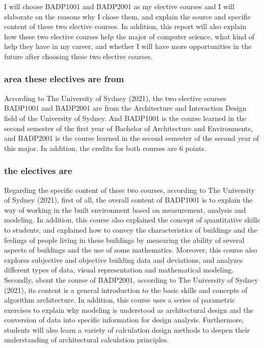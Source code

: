 \documentclass[../draft.tex]{subfiles}
\begin{document}
I will choose BADP1001 and BADP2001 as my elective courses and I will elaborate on the reasons why I chose them, and explain the source and specific content of these two elective courses. In addition, this report will also explain how these two elective courses help the major of computer science, what kind of help they have in my career, and whether I will have more opportunities in the future after choosing these two elective courses.
\subsubsection{area these electives are from}
According to The University of Sydney (2021), the two elective courses BADP1001 and BADP2001 are from the Architecture and Interaction Design field of the University of Sydney. And BADP1001 is the course learned in the second semester of the first year of Bachelor of Architecture and Environments, and BADP2001 is the course learned in the second semester of the second year of this major. In addition, the credits for both courses are 6 points.
\subsubsection{the electives are}
Regarding the specific content of these two courses, according to The University of Sydney (2021), first of all, the overall content of BADP1001 is to explain the way of working in the built environment based on measurement, analysis and modeling. In addition, this course also explained the concept of quantitative skills to students, and explained how to convey the characteristics of buildings and the feelings of people living in these buildings by measuring the ability of several aspects of buildings and the use of some mathematics. Moreover, this course also explores subjective and objective building data and deviations, and analyzes different types of data, visual representation and mathematical modeling. Secondly, about the course of BADP2001, according to The University of Sydney (2021), its content is a general introduction to the basic skills and concepts of algorithm architecture. In addition, this course uses a series of parametric exercises to explain why modeling is understood as architectural design and the conversion of data into specific information for design analysis. Furthermore, students will also learn a variety of calculation design methods to deepen their understanding of architectural calculation principles.
\end{document}
